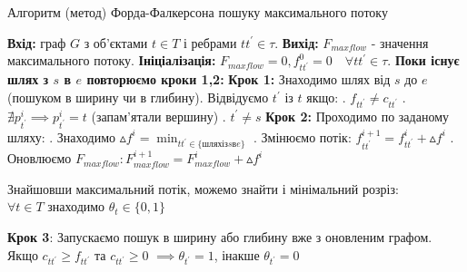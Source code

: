 \begin{algorithm}[H]
    \caption{Алгоритм (метод) Форда-Фалкерсона пошуку максимального потоку}
    \label{al:ford_fulkerson_mas_flow}
    \begin{algorithmic}
        \State \textbf{Вхід:} граф $G$ з об'єктами $ t \in T $ і ребрами $tt^{'} \in \tau$.
        \State \textbf{Вихід:} $ F_{maxflow} $ - значення максимального потоку.
        \State \textbf{Ініціалізація:} $ F_{maxflow} = 0, f_{tt^{'}}^{0} = 0 \quad \forall tt^{'}  \in \tau $.
        \State \textbf{Поки існує шлях з $s$ в $e$ повторюємо кроки 1,2:}
        \State \textbf{Крок 1:} Знаходимо шлях від $s$ до $e$ (пошуком в ширину чи в глибину).
        \State Відвідуємо $ t^{'}$ із $t $ якщо:
        \State {}. $ f_{tt^{'}} \neq c_{tt^{'}} $
        \State {}. $ \nexists p_{t^{'}}^{i} \implies p_{t^{'}}^{i} = t $ (запам'ятали вершину)
        \State {}. $ t^{'} \neq s $
        \State \textbf{Крок 2:} Проходимо по заданому шляху:
        \State {}. Знаходимо $ \vartriangle f^{i} = \min_{tt^{'} \in \{шлях із s в e \}} $
        \State {}. Змінюємо потік: $ f_{tt^{'}}^{i+1} = f_{tt^{'}}^{i} + \vartriangle f^{i} $
        \State {}. Оновлюємо $ F_{maxflow}: F_{maxflow}^{i+1} = F_{maxflow}^{i} + \vartriangle f^{i} $
    \end{algorithmic}

    Знайшовши максимальний потік, можемо знайти і мінімальний розріз: \\
    $\forall t \in T$ знаходимо $\theta_{t} \in \{0,1\}$
    \begin{algorithmic}
        \State \textbf{Крок 3}: Запускаємо пошук в ширину або глибину вже з оновленим графом.
        \State \qquad Якщо $c_{tt^{'}} \geqslant f_{tt^{'}}$ та $c_{tt^{'}} \geqslant 0$
        $\implies \theta_{t^{'}} = 1 $, інакше $\theta_{t^{'}} = 0 $
    \end{algorithmic}
\end{algorithm}

